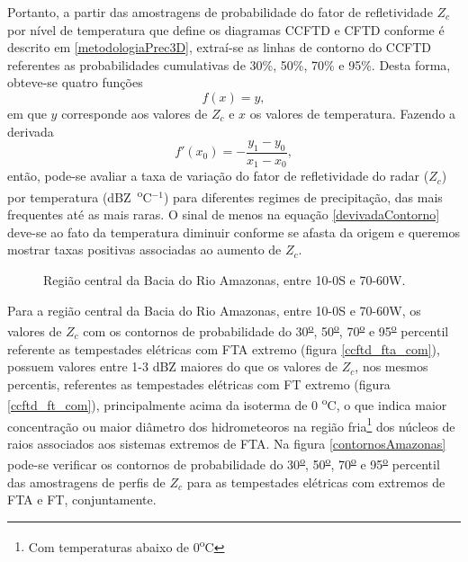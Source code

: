 Portanto, a partir das amostragens de probabilidade do fator de refletividade $Z_c$ por nível de temperatura que define os diagramas CCFTD e CFTD conforme é descrito em \ref{metodologiaPrec3D},  extraí-se as linhas de contorno do CCFTD referentes as probabilidades cumulativas de 30\%, 50\%, 70\% e 95\%. Desta forma, obteve-se quatro funções 
\begin{equation}
f(x)=y ,
\end{equation} 
em que $y$ corresponde aos valores de $Z_c$ e $x$ os valores de temperatura. Fazendo a derivada 
\begin{equation}
f'(x_0)= - \dfrac{y_1 - y_0}{x_1 - x_0},
\label{devivadaContorno}
\end{equation}
então, pode-se avaliar a taxa de variação do fator de refletividade do radar ($Z_c$) por temperatura (dBZ~\textsuperscript{o}C$^{-1}$) para diferentes regimes de precipitação, das mais frequentes até as mais raras. O sinal de menos na equação \ref{devivadaContorno} deve-se ao fato da temperatura diminuir conforme se afasta da origem e queremos mostrar taxas positivas associadas ao aumento de $Z_c$.

\begin{figure}[!ht]
  \centering
  \caption{Região central da Bacia do Rio Amazonas, entre 10-0S e 70-60W.}
  \label{deriv_amazonas}  
\end{figure} 

Para a região central da Bacia do Rio Amazonas, entre 10-0S e 70-60W, os valores de $Z_c$ com os contornos de probabilidade do 30\textsuperscript{\underline{o}}, 50\textsuperscript{\underline{o}}, 70\textsuperscript{\underline{o}} e 95\textsuperscript{\underline{o}} percentil referente as tempestades elétricas com FTA extremo (figura \ref{ccftd_fta_com}), possuem valores entre 1-3 dBZ maiores do que os valores de $Z_c$, nos mesmos percentis, referentes as tempestades elétricas com FT extremo (figura \ref{ccftd_ft_com}), principalmente acima da isoterma de 0 \textsuperscript{o}C, o que indica maior concentração ou maior diâmetro dos hidrometeoros na região fria\footnote{Com temperaturas abaixo de  0\textsuperscript{o}C} dos núcleos de raios associados aos sistemas extremos de FTA. Na figura \ref{contornosAmazonas} pode-se verificar os contornos de probabilidade do 30\textsuperscript{\underline{o}}, 50\textsuperscript{\underline{o}}, 70\textsuperscript{\underline{o}} e 95\textsuperscript{\underline{o}} percentil das amostragens de perfis de $Z_c$  para as tempestades elétricas com extremos de FTA e FT, conjuntamente.

